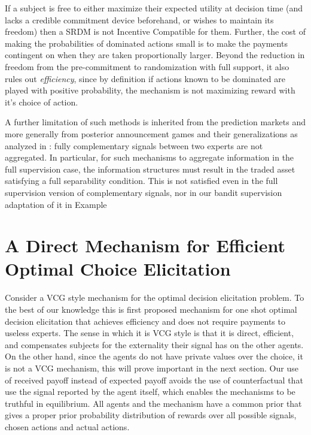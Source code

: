 If a subject is free to either maximize their expected utility at decision time (and lacks a credible commitment device beforehand, or wishes to maintain its freedom) then a SRDM is not Incentive Compatible for them. Further, the cost of making the probabilities of dominated actions small is to make the payments contingent on when they are taken proportionally larger.
Beyond the reduction in freedom from the pre-commitment to randomization with full support, it also rules out \emph{efficiency}, since by definition if actions known to be dominated are played with positive probability, the mechanism is not maximizing reward with it's choice of action.


A further limitation of such methods is inherited from the prediction markets and more generally from posterior announcement games and their generalizations as analyzed in \cite{ostrovsky2012information}: fully complementary signals between two experts are not aggregated. In particular, for such mechanisms to aggregate information in the full supervision case, the information structures must result in the traded asset satisfying a full separability condition. This is not satisfied even in the full supervision version of complementary signals, nor in our bandit supervision adaptation of it in Example~



\section{A Direct Mechanism for Efficient Optimal Choice Elicitation}

Consider a VCG style mechanism for the optimal decision elicitation problem. 
To the best of our knowledge this is first proposed  mechanism for one shot optimal decision elicitation that achieves efficiency and does not require payments to useless experts.
The sense in which it is VCG style is that it is direct, efficient, and compensates subjects for the externality their signal has on the other agents.
On the other hand, since the agents do not have private values over the choice, it is not a VCG mechanism, this will prove important in the next section.
Our use of received payoff instead of expected payoff avoids the use of counterfactual that use the signal reported by the agent itself, which enables the mechanisms to be truthful in equilibrium.
All agents and the mechanism have a common prior that gives a proper prior probability distribution of rewards over all possible signals, chosen actions and actual actions.

